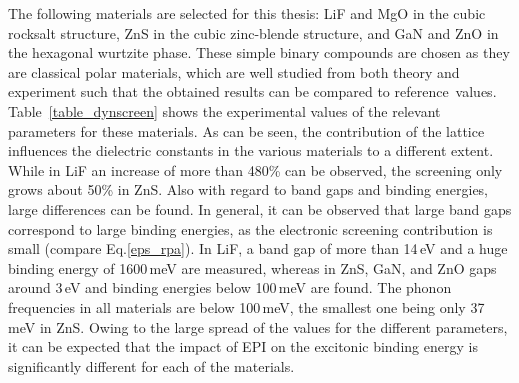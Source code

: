 The following materials are selected for this thesis: LiF and MgO in the cubic rocksalt structure, ZnS in the cubic zinc-blende structure, and GaN and ZnO in the hexagonal wurtzite phase. These simple binary compounds are chosen as they are classical polar materials, which are well studied from both theory and experiment such that the obtained results can be compared to reference~values. Table~\ref{table_dynscreen} shows the experimental values of the relevant parameters for these materials. As can be seen, the contribution of the lattice influences the dielectric constants in the various materials to a different extent.  While  in LiF an increase of more than 480\% can be observed, the screening only grows about 50\% in ZnS. Also with regard to band gaps and binding energies, large differences can be found. In general, it can be observed that large band gaps correspond to large binding energies, as the electronic screening contribution is small (compare Eq.\;\eqref{eps_rpa}).  In LiF, a band gap of more than 14\,eV and a huge binding energy of 1600\,meV are measured, whereas in ZnS, GaN, and ZnO gaps around 3\,eV and binding energies below 100\,meV are found. The phonon frequencies in all materials are below 100\,meV, the smallest one being only 37\,meV in ZnS. Owing to the large spread of the values for the different parameters, it can be expected that the impact of EPI on the excitonic binding energy is significantly different for each of the materials.


